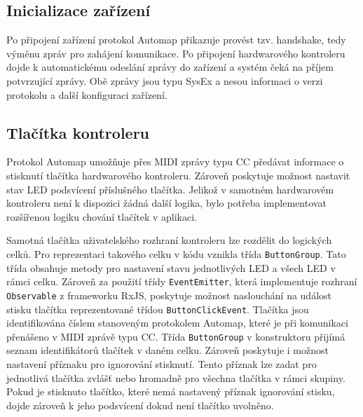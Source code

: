 \documentclass[thesis=M,czech]{FITthesis}[2019/03/06]
\begin{document}
		\subsection{Inicializace zařízení}
		Po připojení zařízení protokol Automap přikazuje provést tzv. handshake, tedy výměnu zpráv
		pro zahájení komunikace. Po připojení hardwarového kontroleru dojde k automatickému odeslání zprávy do zařízení
		a systém čeká na příjem potvrzující zprávy. 
		Obě zprávy jsou typu SysEx a nesou informaci o verzi protokolu a další konfiguraci zařízení.
		
		\subsection{Tlačítka kontroleru}
		Protokol Automap umožňuje přes MIDI zprávy typu CC předávat informace o stisknutí tlačítka
		hardwarového kontroleru. Zároveň poskytuje možnost nastavit stav LED podsvícení příslušného tlačítka.
		Jelikož v samotném hardwarovém kontroleru není k dispozici žádná další logika, bylo potřeba
		implementovat rozšířenou logiku chování tlačítek v aplikaci.
		
		Samotná tlačítka uživatelského rozhraní kontroleru lze rozdělit do logických celků.
		Pro reprezentaci takového celku v kódu vznikla třída \texttt{ButtonGroup}. Tato třída
		obsahuje metody pro nastavení stavu jednotlivých LED a všech LED v rámci celku.
		Zároveň za použití třídy \texttt{EventEmitter}, která implementuje rozhraní \texttt{Observable} 
		z frameworku RxJS, poskytuje možnost naslouchání na událost stisku tlačítka reprezentované třídou \texttt{ButtonClickEvent}.
		Tlačítka jsou identifikována číslem stanoveným protokolem Automap, které je při komunikaci přenášeno
		v MIDI zprávě typu CC. Třída \texttt{ButtonGroup} v konstruktoru přijímá seznam identifikátorů tlačítek
		v daném celku. Zároveň poskytuje i možnost nastavení příznaku pro ignorování stisknutí.
		Tento příznak lze zadat pro jednotlivá tlačítka zvlášť nebo hromadně pro všechna tlačítka v rámci skupiny.
		Pokud je stisknuto tlačítko, které nemá nastavený příznak ignorování stisku, dojde zároveň k jeho podsvícení dokud není tlačítko uvolněno.
		
\end{document}
